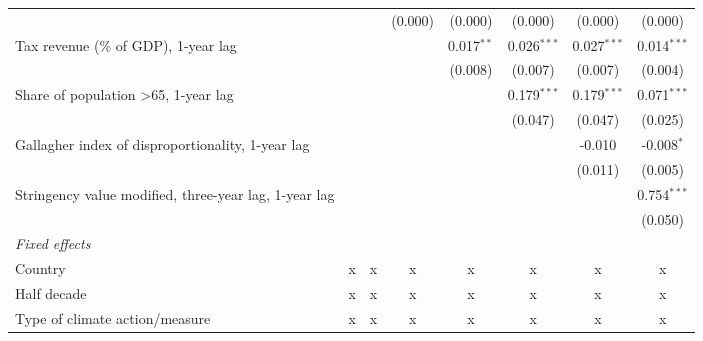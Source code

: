 \begin{table}[htbp]
\begin{tabular}{lccccccc}
                                                                        &         &         & (0.000)      & (0.000)       & (0.000)        & (0.000)        & (0.000)\\   
      Tax revenue (\% of GDP), 1-year lag                               &         &         &              & 0.017$^{**}$  & 0.026$^{***}$  & 0.027$^{***}$  & 0.014$^{***}$\\   
                                                                        &         &         &              & (0.008)       & (0.007)        & (0.007)        & (0.004)\\   
      Share of population >65, 1-year lag                               &         &         &              &               & 0.179$^{***}$  & 0.179$^{***}$  & 0.071$^{***}$\\   
                                                                        &         &         &              &               & (0.047)        & (0.047)        & (0.025)\\   
      Gallagher index of disproportionality, 1-year lag                 &         &         &              &               &                & -0.010         & -0.008$^{*}$\\   
                                                                        &         &         &              &               &                & (0.011)        & (0.005)\\   
      Stringency value modified, three-year lag, 1-year lag             &         &         &              &               &                &                & 0.754$^{***}$\\   
                                                                        &         &         &              &               &                &                & (0.050)\\   
      \emph{Fixed effects}\\
      Country                                                           & x       & x       & x            & x             & x              & x              & x\\  
      Half decade                                                       & x       & x       & x            & x             & x              & x              & x\\  
      Type of climate action/measure                                    & x       & x       & x            & x             & x              & x              & x\\  

\end{tabular}
\end{table}
